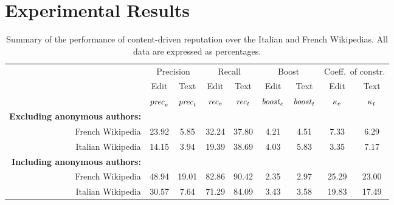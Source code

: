 \section{Experimental Results}

\begin{table*}[t]
\begin{center}
\begin{tabular}{|r||c|c||c|c||c|c||c|c|} \hline
 & \multicolumn{2}{|c||}{Precision}
 & \multicolumn{2}{|c||}{Recall}
 & \multicolumn{2}{|c||}{Boost}
 & \multicolumn{2}{|c|}{Coeff.\ of constr.} \\
 & Edit & Text & Edit & Text  & Edit & Text & Edit & Text \\
 & ${\text{\textit{prec}}}_e$ & ${\text{\textit{prec}}}_t$ & ${\text{\textit{rec}}}_e$ & ${\text{\textit{rec}}}_t$ & ${\text{\textit{boost}}}_e$ & ${\text{\textit{boost}}}_t$ 
 & $\kappa_e$ & $\kappa_t$ \\[0.5ex] \hline 
\textbf{Excluding anonymous authors: \quad} & & & & & & & & \\
\qquad French Wikipedia          & 23.92 &  5.85 & 32.24 & 37.80 & 4.21 & 4.51 &  7.33 &  6.29 \\
\qquad Italian Wikipedia         & 14.15 &  3.94 & 19.39 & 38.69 & 4.03 & 5.83 &  3.35 &  7.17 \\ \hline
\textbf{Including anonymous authors: \quad} & & & & & & & & \\
\qquad French Wikipedia          & 48.94 & 19.01 & 82.86 & 90.42 & 2.35 & 2.97 & 25.29 & 23.00 \\
\qquad Italian Wikipedia         & 30.57 &  7.64 & 71.29 & 84.09 & 3.43 & 3.58 & 19.83 & 17.49 \\ \hline
\end{tabular}
\end{center}
\caption{Summary of the performance of content-driven reputation over
the Italian and French Wikipedias. All data are expressed as percentages.}
\label{tbl:summary-results}
\end{table*}

